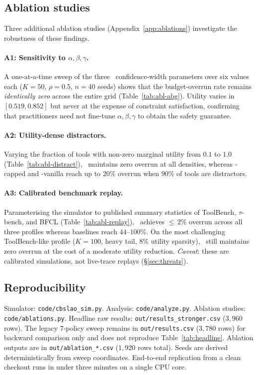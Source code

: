 \subsection{Ablation studies}
\label{sec:ablations-summary}

Three additional ablation studies (Appendix~\ref{app:ablations})
investigate the robustness of these findings.

\paragraph{A1: Sensitivity to $\alpha, \beta, \gamma$.}
A one-at-a-time sweep of the three \CBUC\ confidence-width parameters
over six values each ($K\!=\!50$, $\rho\!=\!0.5$, $n\!=\!40$ seeds)
shows that the budget-overrun rate remains \emph{identically zero}
across the entire grid (Table~\ref{tab:abl-abg}). Utility varies in
$[0.519, 0.852]$ but never at the expense of constraint satisfaction,
confirming that practitioners need not fine-tune $\alpha, \beta, \gamma$
to obtain the safety guarantee.

\paragraph{A2: Utility-dense distractors.}
Varying the fraction of tools with non-zero marginal utility from $0.1$
to $1.0$ (Table~\ref{tab:abl-distract}), \CBUC\ maintains zero overrun
at all densities, whereas \ReAct-capped and \BwK-vanilla reach up to
$20\%$ overrun when $90\%$ of tools are distractors.

\paragraph{A3: Calibrated benchmark replay.}
Parameterising the simulator to published summary statistics of
ToolBench, $\tau$-bench, and BFCL (Table~\ref{tab:abl-replay}),
\CBUC\ achieves ${\le}\,2\%$ overrun across all three profiles whereas
baselines reach $44$--$100\%$. On the most challenging ToolBench-like
profile ($K\!=\!100$, heavy tail, $8\%$ utility sparsity), \CBUC\ still
maintains zero overrun at the cost of a moderate utility reduction.
\emph{Caveat}: these are calibrated simulations, not live-trace replays
(\S\ref{sec:threats}).

\subsection{Reproducibility}
Simulator: \texttt{code/cbslao\_sim.py}. Analysis:
\texttt{code/analyze.py}. Ablation studies:
\texttt{code/ablations.py}. Headline raw results:
\texttt{out/results\_stronger.csv} ($3{,}960$ rows). The legacy
$7$-policy sweep remains in \texttt{out/results.csv} ($3{,}780$ rows)
for backward comparison only and does not reproduce
Table~\ref{tab:headline}. Ablation outputs are in
\texttt{out/ablation\_*.csv} ($1{,}920$ rows total). Seeds are derived
deterministically from sweep coordinates. End-to-end replication from
a clean checkout runs in under three minutes on a single CPU core.
